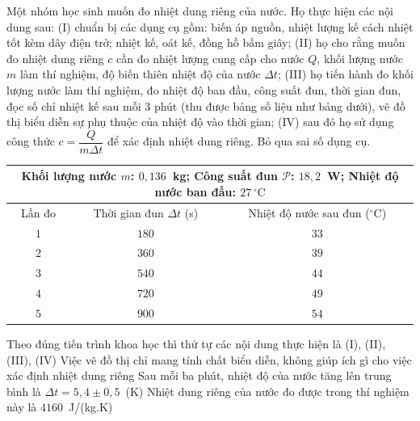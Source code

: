 	\begin{ex}%
		Một nhóm học sinh muốn đo nhiệt dung riêng của nước. Họ thực hiện các nội dung sau: (I) chuẩn bị các dụng cụ gồm: biến áp nguồn, nhiệt lượng kế cách nhiệt tốt kèm dây điện trở; nhiệt kế, oát kế, đồng hồ bấm giây; (II) họ cho rằng muốn đo nhiệt dung riêng $c$ cần đo nhiệt lượng cung cấp cho nước $Q$, khối lượng nước $m$ làm thí nghiệm, độ biến thiên nhiệt độ của nước $\Delta t$; (III) họ tiến hành đo khối lượng nước làm thí nghiệm, đo nhiệt độ ban đầu, công suất đun, thời gian đun, đọc số chỉ nhiệt kế sau mỗi $3$ phút (thu được bảng số liệu như bảng dưới), vẽ đồ thị biểu diễn sự phụ thuộc của nhiệt độ vào thời gian; (IV) sau đó họ sử dụng công thức $c=\dfrac{Q}{m\Delta t}$ để xác định nhiệt dung riêng. Bỏ qua sai số dụng cụ.
		\begin{center}
			{\footnotesize\renewcommand{\arraystretch}{1.25}%
			\begin{tabular}{|c|c|c|}
				\hline
				\multicolumn{3}{|c|}{Khối lượng nước $m$: $0{,}136$~kg; Công suất đun $\mathscr{P}$: $18{,}2$~W; Nhiệt độ nước ban đầu: $27\,^\circ\text{C}$}\\
				\hline
				\hspace*{1.2cm}Lần đo\hspace*{1.2cm} & Thời gian đun $\Delta t$ (s) & Nhiệt độ nước sau đun ($^\circ$C)\\
				\hline
				$1$ & $180$ & $33$\\
				\hline
				$2$ & $360$ & $39$\\
				\hline
				$3$ & $540$ & $44$\\
				\hline
				$4$ & $720$ & $49$\\
				\hline
				$5$ & $900$ & $54$\\
				\hline
			\end{tabular}}
		\end{center}
		\choiceTFt
		{Theo đúng tiến trình khoa học thì thứ tự các nội dung thực hiện là (I), (II), (III), (IV)}
		{Việc vẽ đồ thị chỉ mang tính chất biểu diễn, không giúp ích gì cho việc xác định nhiệt dung riêng}
		{\True Sau mỗi ba phút, nhiệt độ của nước tăng lên trung bình là $\Delta t=5{,}4\pm 0{,}5$~(K)}
		{Nhiệt dung riêng của nước đo được trong thí nghiệm này là $4160$~J/(kg.K)}
\end{ex}
